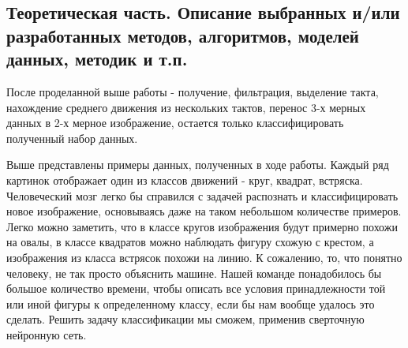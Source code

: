 \subsection{Теоретическая часть. Описание выбранных и/или разработанных методов, алгоритмов, моделей данных, методик и т.п.}
После проделанной выше работы - получение, фильтрация, выделение такта, нахождение среднего движения из нескольких тактов, перенос 3-х мерных данных в 2-х мерное изображение, остается только классифицировать полученный набор данных. 
\begin{figure}[H]
\end{figure}
Выше представлены примеры данных, полученных в ходе работы. Каждый ряд картинок отображает один из классов движений - круг, квадрат, встряска. Человеческий мозг легко бы справился с задачей распознать и классифицировать новое изображение, основываясь даже на таком небольшом количестве примеров. Легко можно заметить, что в классе кругов изображения будут примерно похожи на овалы, в классе квадратов можно наблюдать фигуру схожую с крестом, а изображения из класса встрясок похожи на линию. К сожалению, то, что понятно человеку, не так просто объяснить машине. Нашей команде понадобилось бы большое количество времени, чтобы описать все условия принадлежности той или иной фигуры к определенному классу, если бы нам вообще удалось это сделать. Решить задачу классификации мы сможем, применив сверточную нейронную сеть.
